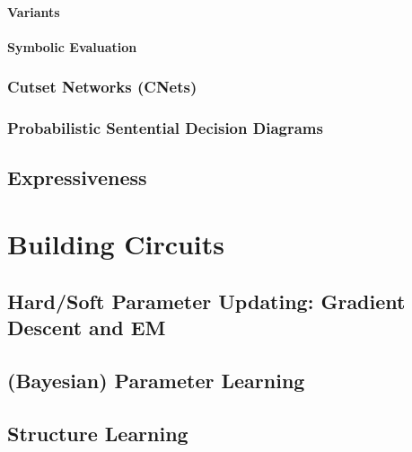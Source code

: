 				\paragraph{Variants} %

				\paragraph{Symbolic Evaluation} %

			\subsubsection{Cutset Networks (CNets)} %

			\subsubsection{Probabilistic Sentential Decision Diagrams} %

		\subsection{Expressiveness} %

	\section{Building Circuits} %

		\subsection{Hard/Soft Parameter Updating: Gradient Descent and EM} %

		\subsection{(Bayesian) Parameter Learning} %

		\subsection{Structure Learning} %

